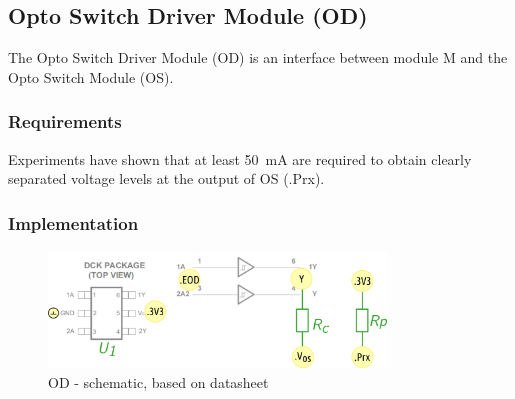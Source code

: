 \subsection{Opto Switch Driver Module (OD)}

The Opto Switch Driver Module (OD) is an interface between module \mu M and the Opto Switch Module (OS).

\subsubsection*{Requirements}

Experiments have shown that at least \SI{50}{\mA} are required to obtain  clearly separated
voltage levels at the output of OS (.Prx).

\subsubsection*{Implementation}


\begin{figure}[h]
    \centering
    \includegraphics[width=0.8\textwidth]{MA/OD/OD}
    \caption{OD - schematic, based on datasheet \cite{noauthor_sn74lvc2g17_2002}}
\end{figure}



\clearpage










